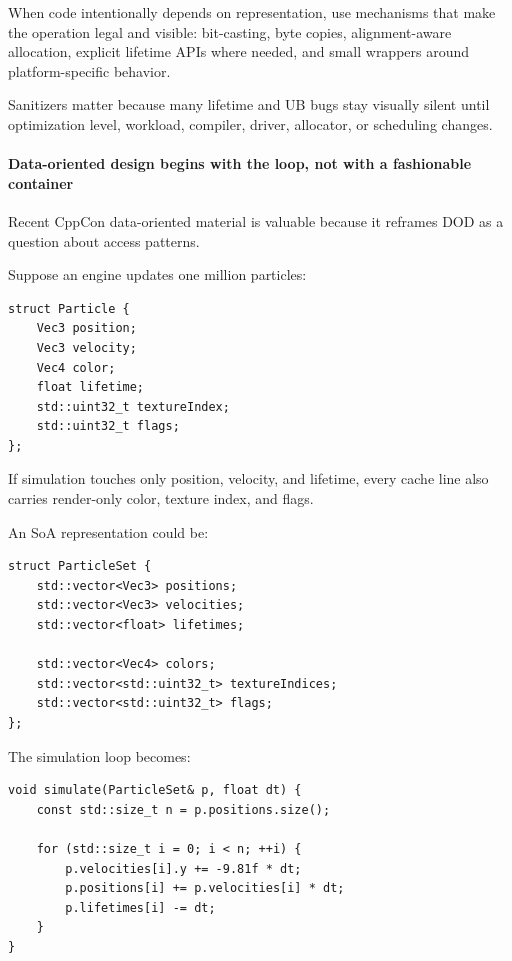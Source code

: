 When code intentionally depends on representation, use mechanisms that make the operation legal and visible: bit-casting, byte copies, alignment-aware allocation, explicit lifetime APIs where needed, and small wrappers around platform-specific behavior.

Sanitizers matter because many lifetime and UB bugs stay visually silent until optimization level, workload, compiler, driver, allocator, or scheduling changes.

\paragraph{Data-oriented design begins with the loop, not with a fashionable container}\label{data-oriented-design-begins-with-the-loop-not-with-a-fashionable-container}

Recent CppCon data-oriented material is valuable because it reframes DOD as a question about access patterns.

Suppose an engine updates one million particles:

\begin{verbatim}
struct Particle {
    Vec3 position;
    Vec3 velocity;
    Vec4 color;
    float lifetime;
    std::uint32_t textureIndex;
    std::uint32_t flags;
};
\end{verbatim}

If simulation touches only position, velocity, and lifetime, every cache line also carries render-only color, texture index, and flags.

An SoA representation could be:

\begin{verbatim}
struct ParticleSet {
    std::vector<Vec3> positions;
    std::vector<Vec3> velocities;
    std::vector<float> lifetimes;

    std::vector<Vec4> colors;
    std::vector<std::uint32_t> textureIndices;
    std::vector<std::uint32_t> flags;
};
\end{verbatim}

The simulation loop becomes:

\begin{verbatim}
void simulate(ParticleSet& p, float dt) {
    const std::size_t n = p.positions.size();

    for (std::size_t i = 0; i < n; ++i) {
        p.velocities[i].y += -9.81f * dt;
        p.positions[i] += p.velocities[i] * dt;
        p.lifetimes[i] -= dt;
    }
}
\end{verbatim}

